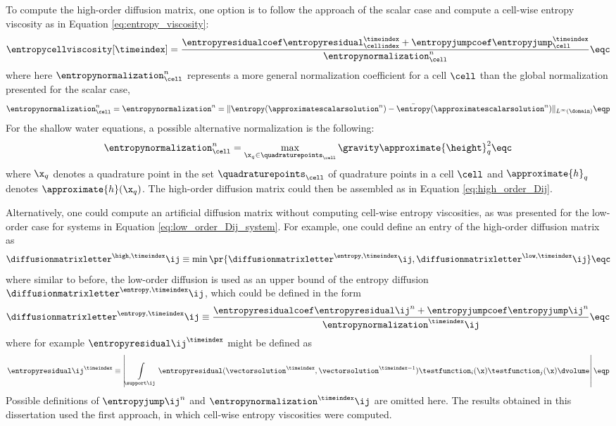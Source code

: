 To compute the high-order diffusion matrix, one option is to follow the approach
of the scalar case and compute a cell-wise entropy viscosity as in Equation
\eqref{eq:entropy_viscosity}:
\begin{equation}
   \entropycellviscosity[\timeindex] = \frac{\entropyresidualcoef
   \entropyresidual_\cellindex^\timeindex
   + \entropyjumpcoef\entropyjump_\cell^\timeindex}
   {\entropynormalization^n_\cell}
   \eqc
\end{equation}
where here $\entropynormalization^n_\cell$ represents a more general
normalization coefficient for a cell $\cell$ than the global normalization
presented for the scalar case,
\begin{equation}
  \entropynormalization^n_\cell = \entropynormalization^n =
    \|\entropy(\approximatescalarsolution^n)
   -\bar{\entropy}(\approximatescalarsolution^n)\|_{L^\infty(\domain)} \eqp
\end{equation}
For the shallow water equations, a possible alternative normalization
is the following:
\begin{equation}
  \entropynormalization^n_\cell =
    \max\limits_{\x_q\in\quadraturepoints_\cell} \gravity \approximate{\height}_q^2
  \eqc
\end{equation}
where $\x_q$ denotes a quadrature point in the set $\quadraturepoints_\cell$
of quadrature points in a cell $\cell$ and
$\approximate{h}_q$ denotes $\approximate{h}(\x_q)$. The high-order diffusion matrix
could then be assembled as in Equation \eqref{eq:high_order_Dij}.

Alternatively, one could compute an artificial diffusion matrix without
computing cell-wise entropy viscosities, as was presented for the low-order
case for systems in Equation \eqref{eq:low_order_Dij_system}.
For example, one could define an entry of the high-order diffusion matrix
as
\begin{equation}
  \diffusionmatrixletter^{\high,\timeindex}\ij \equiv
    \min\pr{\diffusionmatrixletter^{\entropy,\timeindex}\ij,
      \diffusionmatrixletter^{\low,\timeindex}\ij}
  \eqc
\end{equation}
where similar to before, the low-order diffusion is used as an upper
bound of the entropy diffusion $\diffusionmatrixletter^{\entropy,\timeindex}\ij$,
which could be defined in the form
\begin{equation}
  \diffusionmatrixletter^{\entropy,\timeindex}\ij \equiv
    \frac{\entropyresidualcoef\entropyresidual\ij^n +
      \entropyjumpcoef\entropyjump\ij^n}
      {\entropynormalization^\timeindex\ij}
  \eqc
\end{equation}
where for example $\entropyresidual\ij^\timeindex$ might be defined as
\begin{equation}
  \entropyresidual\ij^\timeindex \equiv \left|
    \int\limits_{\support\ij}
      \entropyresidual(\vectorsolution^\timeindex,\vectorsolution^{\timeindex-1})
      \testfunction_i(\x)
      \testfunction_j(\x) \dvolume
    \right|
  \eqp
\end{equation}
Possible definitions of $\entropyjump\ij^n$ and
$\entropynormalization^\timeindex\ij$ are omitted here.
The results obtained in this dissertation used the first approach, in
which cell-wise entropy viscosities were computed.

